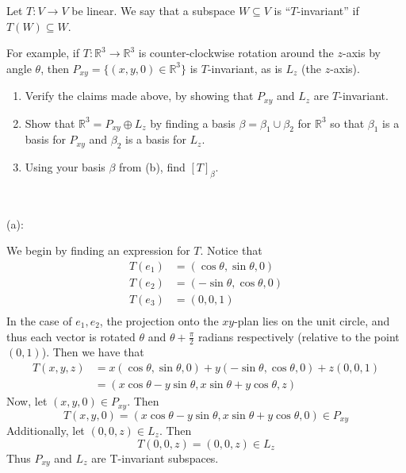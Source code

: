 \documentclass{eh-homework}
\begin{document}
    \begin{question}{11}
        Let \( T : V \to V \) be linear. We say that a subspace \( W \subseteq V \) is ``\( T \)-invariant'' if \( T(W) \subseteq W \).

        For example, if \( T : \mathbb{R}^3 \to \mathbb{R}^3 \) is counter-clockwise rotation around the \( z \)-axis by angle \( \theta \), then \( P_{xy} = \{(x, y, 0) \in \mathbb{R}^3\} \) is \( T \)-invariant, as is \( L_z \) (the \( z \)-axis).

        \begin{enumerate}[label=(\alph*)]
            \item Verify the claims made above, by showing that \( P_{xy} \) and \( L_z \) are \( T \)-invariant.
            \item Show that \( \mathbb{R}^3 = P_{xy} \oplus L_z \) by finding a basis \( \beta = \beta_1 \cup \beta_2 \) for \( \mathbb{R}^3 \) so that \( \beta_1 \) is a basis for \( P_{xy} \) and \( \beta_2 \) is a basis for \( L_z \).
            \item Using your basis \( \beta \) from (b), find \( [T]_\beta \).
        \end{enumerate}
        \tcblower
        \ 

        (a):

        We begin by finding an expression for \(T\). Notice that
        \begin{align*}
            T(e_1) &= (\cos \theta , \sin \theta , 0) \\
            T(e_2) &= (-\sin \theta, \cos \theta, 0) \\
            T(e_3) &= (0,0,1) \\
        \end{align*}
        In the case of \(e_1, e_2\), the projection onto the \(xy\)-plan lies on the unit circle, and thus each vector is rotated \(\theta\) and \(\theta + \frac{\pi}{2}\) radians respectively (relative to the point \((0,1)\)). Then we have that
        \begin{align*}
            T(x,y,z) &= x(\cos \theta , \sin \theta , 0) + y(-\sin \theta , \cos \theta , 0) + z(0,0,1) \\
            &= (x\cos \theta - y\sin \theta , x\sin \theta +y\cos \theta , z)
        \end{align*}
        Now, let \((x,y,0) \in P_{xy}\). Then
        \[
            T(x,y,0) = (x \cos \theta - y\sin \theta , x\sin \theta + y\cos \theta , 0) \in P_{xy}
        \]
        Additionally, let \((0,0,z) \in L_z\). Then
        \[
            T(0,0,z) = (0,0,z) \in L_z
        \]
        Thus \(P_{xy}\) and \(L_z\) are T-invariant subspaces.


\end{question}
\end{document}
